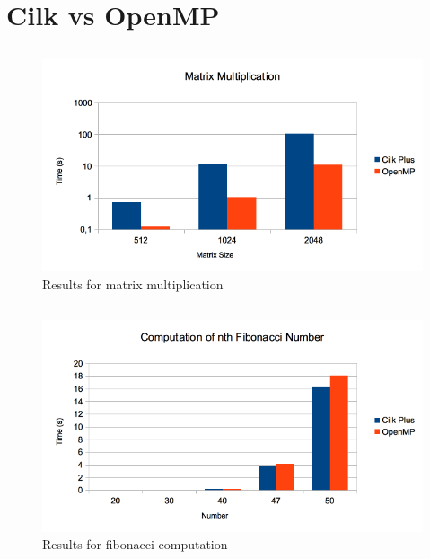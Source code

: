 \documentclass{beamer}
\begin{document}
\section{Cilk vs OpenMP}
\subsection{}
\begin{frame}
		\begin{figure}[!htb]
			\centering
			\includegraphics[scale=0.45]{images/matrix.png}
			\caption{Results for matrix multiplication}
			\label{roofline}
		\end{figure}
\end{frame}

\subsection{}
\begin{frame}
		\begin{figure}[!htb]
			\centering
			\includegraphics[scale=0.45]{images/fib.png}
			\caption{Results for fibonacci computation}
			\label{roofline}
		\end{figure}
\end{frame}
\end{document}
